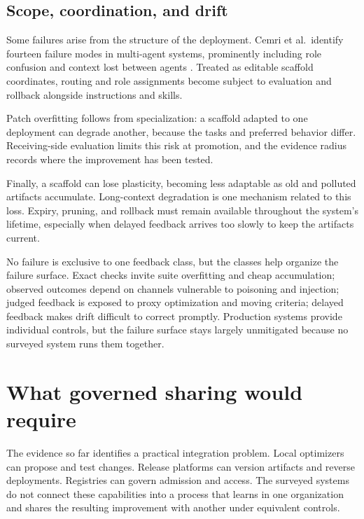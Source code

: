 \subsection{Scope, coordination, and drift}\label{scope-coordination-and-drift}

Some failures arise from the structure of the deployment. Cemri et al.~identify fourteen failure modes in multi-agent systems, prominently including role confusion and context lost between agents \cite{cemri2025mast}. Treated as editable scaffold coordinates, routing and role assignments become subject to evaluation and rollback alongside instructions and skills.

Patch overfitting follows from specialization: a scaffold adapted to one deployment can degrade another, because the tasks and preferred behavior differ. Receiving-side evaluation limits this risk at promotion, and the evidence radius records where the improvement has been tested.

Finally, a scaffold can lose plasticity, becoming less adaptable as old and polluted artifacts accumulate. Long-context degradation \cite{liu2023lostmiddle} is one mechanism related to this loss. Expiry, pruning, and rollback must remain available throughout the system's lifetime, especially when delayed feedback arrives too slowly to keep the artifacts current.

No failure is exclusive to one feedback class, but the classes help organize the failure surface. Exact checks invite suite overfitting and cheap accumulation; observed outcomes depend on channels vulnerable to poisoning and injection; judged feedback is exposed to proxy optimization and moving criteria; delayed feedback makes drift difficult to correct promptly. Production systems provide individual controls, but the failure surface stays largely unmitigated because no surveyed system runs them together.

\section{What governed sharing would require}\label{sec:gap}

The evidence so far identifies a practical integration problem. Local optimizers can propose and test changes. Release platforms can version artifacts and reverse deployments. Registries can govern admission and access. The surveyed systems do not connect these capabilities into a process that learns in one organization and shares the resulting improvement with another under equivalent controls.

